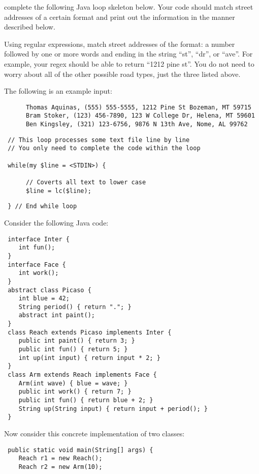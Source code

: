\documentclass[addpoints]{exam}
\begin{document}
\begin{questions}
\newpage

\question[15]
complete the following Java loop skeleton below. Your code should match street addresses of a certain format and print out the information in the manner described below.

Using regular expressions, match street addresses of the format: a number followed by one or more words and ending in the string ``st'', ``dr'', or ``ave''. For example, your regex should be able to return ``1212 pine st''. You do not need to worry about all of the other possible road types, just the three listed above.

The following is an example input:

\begin{verbatim}
      Thomas Aquinas, (555) 555-5555, 1212 Pine St Bozeman, MT 59715
      Bram Stoker, (123) 456-7890, 123 W College Dr, Helena, MT 59601
      Ben Kingsley, (321) 123-6756, 9876 N 13th Ave, Nome, AL 99762
\end{verbatim}

\begin{lstlisting}
 // This loop processes some text file line by line
 // You only need to complete the code within the loop
 
 while(my $line = <STDIN>) {
 
      // Coverts all text to lower case
      $line = lc($line);
\end{lstlisting}
\begin{lstlisting}
 } // End while loop
\end{lstlisting}

\newpage

\question[20]
Consider the following Java code:
\begin{lstlisting}
 interface Inter {
    int fun();
 }
 interface Face {
    int work();
 }
 abstract class Picaso {
    int blue = 42;
    String period() { return "."; }
    abstract int paint();
 }
 class Reach extends Picaso implements Inter {
    public int paint() { return 3; }
    public int fun() { return 5; }
    int up(int input) { return input * 2; }
 }
 class Arm extends Reach implements Face {
    Arm(int wave) { blue = wave; }
    public int work() { return 7; }
    public int fun() { return blue + 2; }
    String up(String input) { return input + period(); }
 }
\end{lstlisting}

Now consider this concrete implementation of two classes:
\begin{lstlisting}
 public static void main(String[] args) {
    Reach r1 = new Reach();
    Reach r2 = new Arm(10);
    

\end{lstlisting}
\end{questions}
\end{document}
